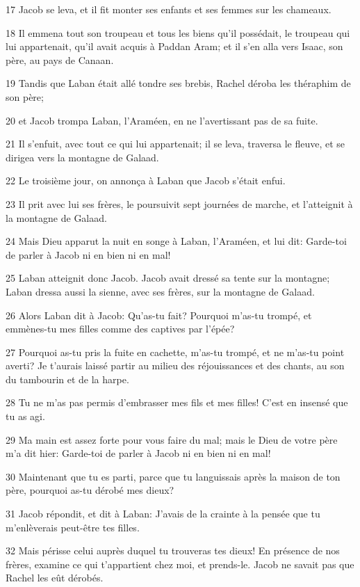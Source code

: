 \par 17 Jacob se leva, et il fit monter ses enfants et ses femmes sur les chameaux.
\par 18 Il emmena tout son troupeau et tous les biens qu'il possédait, le troupeau qui lui appartenait, qu'il avait acquis à Paddan Aram; et il s'en alla vers Isaac, son père, au pays de Canaan.
\par 19 Tandis que Laban était allé tondre ses brebis, Rachel déroba les théraphim de son père;
\par 20 et Jacob trompa Laban, l'Araméen, en ne l'avertissant pas de sa fuite.
\par 21 Il s'enfuit, avec tout ce qui lui appartenait; il se leva, traversa le fleuve, et se dirigea vers la montagne de Galaad.
\par 22 Le troisième jour, on annonça à Laban que Jacob s'était enfui.
\par 23 Il prit avec lui ses frères, le poursuivit sept journées de marche, et l'atteignit à la montagne de Galaad.
\par 24 Mais Dieu apparut la nuit en songe à Laban, l'Araméen, et lui dit: Garde-toi de parler à Jacob ni en bien ni en mal!
\par 25 Laban atteignit donc Jacob. Jacob avait dressé sa tente sur la montagne; Laban dressa aussi la sienne, avec ses frères, sur la montagne de Galaad.
\par 26 Alors Laban dit à Jacob: Qu'as-tu fait? Pourquoi m'as-tu trompé, et emmènes-tu mes filles comme des captives par l'épée?
\par 27 Pourquoi as-tu pris la fuite en cachette, m'as-tu trompé, et ne m'as-tu point averti? Je t'aurais laissé partir au milieu des réjouissances et des chants, au son du tambourin et de la harpe.
\par 28 Tu ne m'as pas permis d'embrasser mes fils et mes filles! C'est en insensé que tu as agi.
\par 29 Ma main est assez forte pour vous faire du mal; mais le Dieu de votre père m'a dit hier: Garde-toi de parler à Jacob ni en bien ni en mal!
\par 30 Maintenant que tu es parti, parce que tu languissais après la maison de ton père, pourquoi as-tu dérobé mes dieux?
\par 31 Jacob répondit, et dit à Laban: J'avais de la crainte à la pensée que tu m'enlèverais peut-être tes filles.
\par 32 Mais périsse celui auprès duquel tu trouveras tes dieux! En présence de nos frères, examine ce qui t'appartient chez moi, et prends-le. Jacob ne savait pas que Rachel les eût dérobés.
